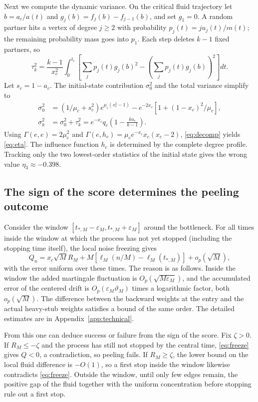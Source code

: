Next we compute the dynamic variance. On the critical fluid trajectory let $b=a_c/a(t)$ and
$g_j(b)=f_j(b)-f_{j-1}(b)$, and set $g_1=0$. A random partner hits a vertex of degree $j\ge2$ with
probability $p_j(t)=j u_j(t)/m(t)$; the remaining probability mass goes into $p_1$. Each step deletes $k-1$
fixed partners, so
\begin{equation}
\tau_k^2=\frac{k-1}{x_c^2}\int_0^{t_c}
\left[\sum_jp_j(t)g_j(b)^2-\left(\sum_jp_j(t)g_j(b)\right)^2\right]dt.\label{eq:tau}
\end{equation}
Let $s_c=1-a_c$. The initial-state contribution $\sigma_0^2$ and the total variance simplify to
\begin{align*}
\sigma_0^2&=(1/\mu_c+s_c^2)e^{\mu_c(s_c^2-1)}
-e^{-2x_c}[1+(1-x_c)^2/\mu_c],\\
\sigma_k^2&=\sigma_0^2+\tau_k^2=e^{-x_c}q_c\left(1-\frac{k a_c}{k-1}\right).
\end{align*}
Using $\Gamma(e,e)=2\mu_c^2$ and $\Gamma(e,h_c)=\mu_ce^{-x_c}x_c(x_c-2)$, \eqref{eq:decomp} yields
\eqref{eq:eta}. The influence function $h_c$ is determined by the complete degree profile. Tracking only the
two lowest-order statistics of the initial state gives the wrong value $\eta_3\approx-0.398$.

\subsection{The sign of the score determines the peeling outcome}\label{sec:mp-global}
Consider the window $[t_{*,M}-\varepsilon_M,t_{*,M}+\varepsilon_M]$ around the bottleneck. For all times
inside the window at which the process has not yet stopped (including the stopping time itself), the local
noise freezing gives
\begin{equation}
Q_n=x_c\sqrt M R_M+M[\ell_M(n/M)-\ell_M(t_{*,M})]+o_p(\sqrt M),\label{eq:freeze}
\end{equation}
with the error uniform over these times. The reason is as follows. Inside the window the added martingale
fluctuation is $O_p(\sqrt{M\varepsilon_M})$, and the accumulated error of the centered drift is
$O_p(\varepsilon_M\vartheta_M)$ times a logarithmic factor, both $o_p(\sqrt M)$. The difference between the
backward weights at the entry and the actual heavy-stub weights satisfies a bound of the same order. The
detailed estimates are in Appendix~\ref{app:technical}.

From this one can deduce success or failure from the sign of the score. Fix $\zeta>0$. If $R_M\le-\zeta$ and
the process has still not stopped by the central time, \eqref{eq:freeze} gives $Q<0$, a contradiction, so
peeling fails. If $R_M\ge\zeta$, the lower bound on the local fluid difference is $-O(1)$, so a first stop
inside the window likewise contradicts \eqref{eq:freeze}. Outside the window, until only few edges remain,
the positive gap of the fluid together with the uniform concentration before stopping rule out a first stop.

